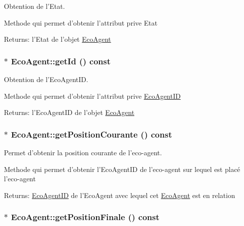 Obtention de l'Etat. 

Methode qui permet d'obtenir l'attribut prive Etat

\begin{Desc}
\item[Returns:]l'Etat de l'objet \hyperlink{classEcoAgent}{EcoAgent} \end{Desc}
\hypertarget{classEcoAgent_888101c39bee652681dffcb36bd9bb01}{
\subsubsection[{getId}]{ $\ast$ EcoAgent::getId () const}}
\label{classEcoAgent_888101c39bee652681dffcb36bd9bb01}


Obtention de l'EcoAgentID. 

Methode qui permet d'obtenir l'attribut prive \hyperlink{classEcoAgentID}{EcoAgentID}

\begin{Desc}
\item[Returns:]l'EcoAgentID de l'objet \hyperlink{classEcoAgent}{EcoAgent} \end{Desc}
\hypertarget{classEcoAgent_01733b6103c367848cb4b8477cae5e51}{
\subsubsection[{getPositionCourante}]{ $\ast$ EcoAgent::getPositionCourante () const}}
\label{classEcoAgent_01733b6103c367848cb4b8477cae5e51}


Permet d'obtenir la position courante de l'eco-agent. 

Methode qui permet d'obtenir l'EcoAgentID de l'eco-agent sur lequel est placé l'eco-agent

\begin{Desc}
\item[Returns:]\hyperlink{classEcoAgentID}{EcoAgentID} de l'EcoAgent avec lequel cet \hyperlink{classEcoAgent}{EcoAgent} est en relation \end{Desc}
\hypertarget{classEcoAgent_2b5ca918f5ca154c8109022f364c275d}{
\subsubsection[{getPositionFinale}]{ $\ast$ EcoAgent::getPositionFinale () const}}
\label{classEcoAgent_2b5ca918f5ca154c8109022f364c275d}


